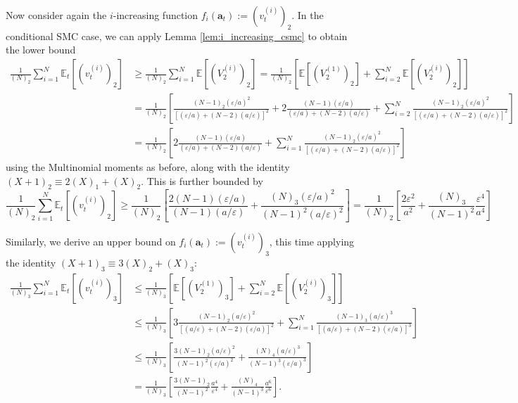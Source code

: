 \documentclass[fleqn]{article}
\theoremstyle{definition}
\newcommand{\E}{\mathbb{E}}
\newcommand{\1}[1]{\mathbbm{1}_{\{#1\}}}
\newcommand{\vt}[2][t]{v_{#1}^{(#2)}}
\begin{document}
Now consider again the $i$-increasing function $f_i(\mathbf{a}_t) := (\vt{i})_2$. In the conditional SMC case, we can apply Lemma \ref{lem:i_increasing_csmc} to obtain the lower bound
\begin{align*}
\frac{1}{(N)_2} \sum_{i=1}^N \E_t[(\vt{i})_2] 
&\geq \frac{1}{(N)_2} \sum_{i=1}^N \E[(V_2^{(i)})_2] 
=  \frac{1}{(N)_2} \left[ \E[(V_2^{(1)})_2] + \sum_{i=2}^N \E[(V_2^{(i)})_2] \right] \\
&= \frac{1}{(N)_2} \left[ \frac{(N-1)_2 (\varepsilon/a)^2}{[(\varepsilon/a) + (N-2)(a/\varepsilon)]^2} + 2 \frac{(N-1)(\varepsilon/a)}{(\varepsilon/a) + (N-2)(a/\varepsilon)} + \sum_{i=2}^N \frac{(N-1)_2 (\varepsilon/a)^2}{[(\varepsilon/a) + (N-2)(a/\varepsilon)]^2} \right] \\
&= \frac{1}{(N)_2} \left[ 2 \frac{(N-1)(\varepsilon/a)}{(\varepsilon/a) + (N-2)(a/\varepsilon)} + \sum_{i=1}^N \frac{(N-1)_2 (\varepsilon/a)^2}{[(\varepsilon/a) + (N-2)(a/\varepsilon)]^2} \right]
\end{align*}
using the Multinomial moments as before, along with the identity $(X+1)_2 \equiv 2(X)_1 +(X)_2$.
This is further bounded by
\begin{equation*}
\frac{1}{(N)_2} \sum_{i=1}^N \E_t[(\vt{i})_2] 
\geq \frac{1}{(N)_2} \left[ \frac{2(N-1)(\varepsilon/a)}{(N-1)(a/\varepsilon)} + \frac{(N)_3 (\varepsilon/a)^2}{(N-1)^2(a/\varepsilon)^2} \right]
= \frac{1}{(N)_2} \left[\frac{2\varepsilon^2}{a^2} + \frac{(N)_3}{(N-1)^2}\frac{\varepsilon^4}{a^4}  \right] 
\end{equation*}

Similarly, we derive an upper bound on $f_i(\mathbf{a}_t) := (\vt{i})_3$, this time applying the identity $(X+1)_3 \equiv 3(X)_2 +(X)_3 $:
\begin{align*}
\frac{1}{(N)_3} \sum_{i=1}^N \E_t[(\vt{i})_3] 
&\leq \frac{1}{(N)_3} \left[ \E[(V_2^{(1)})_3] + \sum_{i=2}^N \E[(V_2^{(i)})_3] \right] \\
&\leq \frac{1}{(N)_3} \left[ 3 \frac{(N-1)_2 (a/\varepsilon)^2}{[(a/\varepsilon) + (N-2)(\varepsilon/a)]^2} + \sum_{i=1}^N \frac{(N-1)_3 (a/\varepsilon)^3}{[(a/\varepsilon) + (N-2)(\varepsilon/a)]^3} \right] \\
&\leq \frac{1}{(N)_3} \left[ \frac{3(N-1)_2 (a/\varepsilon)^2}{(N-1)^2 (\varepsilon/a)^2} + \frac{(N)_4 (a/\varepsilon)^3}{(N-1)^3 (\varepsilon/a)^3} \right] \\
&= \frac{1}{(N)_3} \left[ \frac{3(N-1)_2}{(N-1)^2} \frac{a^4}{\varepsilon^4} +\frac{(N)_4}{(N-1)^3} \frac{a^6}{\varepsilon^6} \right].
\end{align*}
\end{document}
